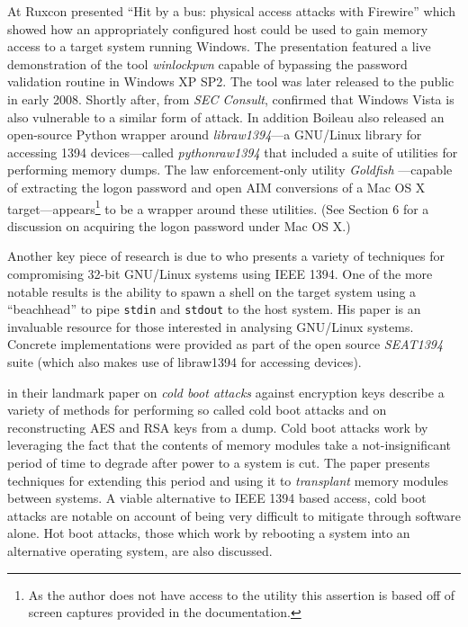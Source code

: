 \documentclass[numbers=noenddot,      %
               abstract,              %
               captions=tableheading, %
               DIV=8]                 %
              {scrartcl}
\begin{document}
At Ruxcon \cite{boileau06} presented ``Hit by a bus: physical access
attacks with Firewire'' which showed how an appropriately configured
host could be used to gain memory access to a target system running
Windows. The presentation featured a live demonstration of the tool
\emph{winlockpwn} \citep{boileau08} capable of bypassing the password
validation routine in Windows XP SP2. The tool was later released to the
public in early 2008. Shortly after, \cite{panholzer08} from \emph{SEC
  Consult}, confirmed that Windows Vista is also vulnerable to a similar
form of attack. In addition Boileau also released an open-source Python
wrapper around \emph{libraw1394}---a GNU/Linux library for accessing
1394 devices---called \emph{pythonraw1394} that included a suite of
utilities for performing memory dumps. The law enforcement-only utility
\emph{Goldfish} \citep{almansoori09}---capable of extracting the logon
password and open AIM conversions of a Mac OS X
target---appears\footnote{As the author does not have access to the
  utility this assertion is based off of screen captures provided in
  the documentation.} to be a wrapper around these utilities. (See
Section 6 for a discussion on acquiring the logon password under Mac OS
X.)

Another key piece of research is due to \cite{piegdon07} who presents a
variety of techniques for compromising 32-bit GNU/Linux systems using
IEEE 1394. One of the more notable results is the ability to spawn a
shell on the target system using a ``beachhead'' to pipe \verb:stdin:
and \verb:stdout: to the host system. His paper is an invaluable
resource for those interested in analysing GNU/Linux systems. Concrete
implementations were provided as part of the open source \emph{SEAT1394}
suite (which also makes use of libraw1394 for accessing devices).

\cite{halderman08} in their landmark paper on \emph{cold boot attacks}
against encryption keys describe a variety of methods for performing so
called cold boot attacks and on reconstructing AES and RSA keys from a
dump. Cold boot attacks work by leveraging the fact that the contents of
memory modules take a not-insignificant period of time to degrade after
power to a system is cut. The paper presents techniques for extending
this period and using it to \emph{transplant} memory modules between
systems. A viable alternative to IEEE 1394 based access, cold boot
attacks are notable on account of being very difficult to mitigate
through software alone. Hot boot attacks, those which work by rebooting
a system into an alternative operating system, are also discussed.
\end{document}
